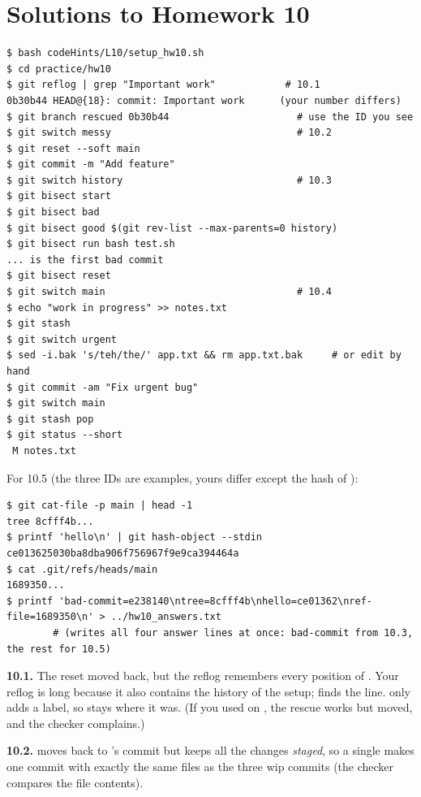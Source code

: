 \section*{Solutions to Homework 10}

\begin{lstlisting}
$ bash codeHints/L10/setup_hw10.sh
$ cd practice/hw10
$ git reflog | grep "Important work"            # 10.1
0b30b44 HEAD@{18}: commit: Important work      (your number differs)
$ git branch rescued 0b30b44                      # use the ID you see
$ git switch messy                                # 10.2
$ git reset --soft main
$ git commit -m "Add feature"
$ git switch history                              # 10.3
$ git bisect start
$ git bisect bad
$ git bisect good $(git rev-list --max-parents=0 history)
$ git bisect run bash test.sh
... is the first bad commit
$ git bisect reset
$ git switch main                                 # 10.4
$ echo "work in progress" >> notes.txt
$ git stash
$ git switch urgent
$ sed -i.bak 's/teh/the/' app.txt && rm app.txt.bak     # or edit by hand
$ git commit -am "Fix urgent bug"
$ git switch main
$ git stash pop
$ git status --short
 M notes.txt
\end{lstlisting}

For 10.5 (the three IDs are examples, yours differ except the hash of ):

\begin{lstlisting}
$ git cat-file -p main | head -1
tree 8cfff4b...
$ printf 'hello\n' | git hash-object --stdin
ce013625030ba8dba906f756967f9e9ca394464a
$ cat .git/refs/heads/main
1689350...
$ printf 'bad-commit=e238140\ntree=8cfff4b\nhello=ce01362\nref-file=1689350\n' > ../hw10_answers.txt
        # (writes all four answer lines at once: bad-commit from 10.3, the rest for 10.5)
\end{lstlisting}

\textbf{10.1.} The reset moved  back, but the reflog remembers every position of . Your reflog is long because it also contains the history of the setup;  finds the line.  only adds a label, so  stays where it was. (If you used  on , the rescue works but  moved, and the checker complains.)

\textbf{10.2.}  moves  back to 's commit but keeps all the changes \emph{staged}, so a single  makes one commit with exactly the same files as the three wip commits (the checker compares the file contents).

